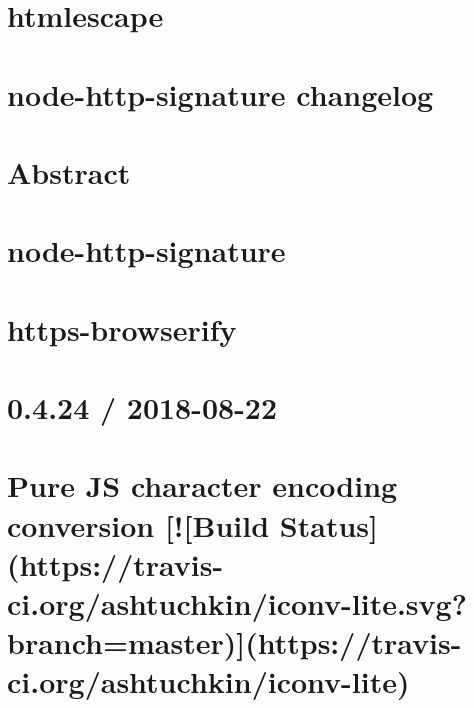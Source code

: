\documentclass[twoside]{book}
\newcommand{\+}{\discretionary{\mbox{\scriptsize$\hookleftarrow$}}{}{}}
\begin{document}
\chapter{htmlescape}
\label{md_dsmacc_examples_DRmerge_node_modules_htmlescape_README}

\chapter{node-\/http-\/signature changelog}
\label{md_dsmacc_examples_DRmerge_node_modules_http-signature_CHANGES}

\chapter{Abstract}
\label{md_dsmacc_examples_DRmerge_node_modules_http-signature_http_signing}

\chapter{node-\/http-\/signature}
\label{md_dsmacc_examples_DRmerge_node_modules_http-signature_README}

\chapter{https-\/browserify}
\label{md_dsmacc_examples_DRmerge_node_modules_https-browserify_readme}

\chapter{0.4.24 / 2018-\/08-\/22}
\label{md_dsmacc_examples_DRmerge_node_modules_iconv-lite_Changelog}

\chapter{Pure JS character encoding conversion \mbox{[}!\mbox{[}Build Status\mbox{]}(https\+://travis-\/ci.org/ashtuchkin/iconv-\/lite.svg?branch=master)\mbox{]}(https\+://travis-\/ci.org/ashtuchkin/iconv-\/lite)}
\label{md_dsmacc_examples_DRmerge_node_modules_iconv-lite_README}

\end{document}

